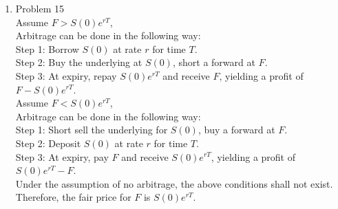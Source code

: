 \documentclass[leqno,12pt]{article}
\begin{document}
\begin{enumerate}
\pagebreak

\item Problem 15\\
Assume $F>S(0)e^{rT}$,\\
Arbitrage can be done in the following way:\\
Step 1: Borrow $S(0)$ at rate $r$ for time $T$.\\
Step 2: Buy the underlying at $S(0)$, short a forward at $F$.\\
Step 3: At expiry, repay $S(0)e^{rT}$ and receive $F$, yielding a profit of $F-S(0)e^{rT}$.\\
\newline
Assume $F<S(0)e^{rT}$,\\
Arbitrage can be done in the following way:\\
Step 1: Short sell the underlying for $S(0)$, buy a forward at $F$.\\
Step 2: Deposit $S(0)$ at rate $r$ for time $T$.\\
Step 3: At expiry, pay $F$ and receive $S(0)e^{rT}$, yielding a profit of $S(0)e^{rT}-F$.\\
\newline
Under the assumption of no arbitrage, the above conditions shall not exist.\\
Therefore, the fair price for $F$ is $S(0)e^{rT}$.
\end{enumerate}
\end{document}
